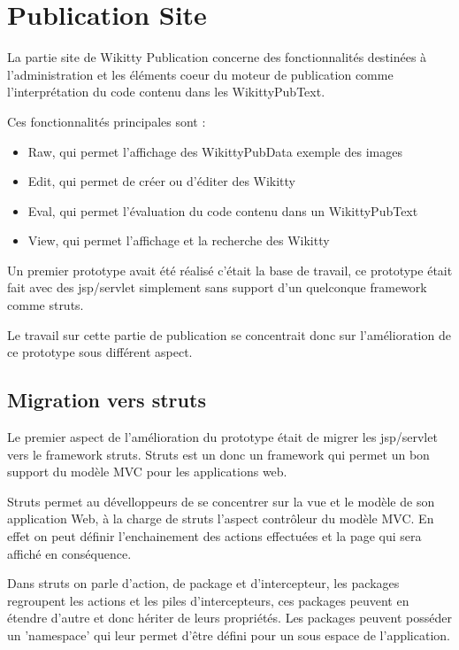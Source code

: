 \section{Publication Site}

La partie site de Wikitty Publication concerne des fonctionnalités
destinées à l'administration et les éléments coeur du moteur de publication
comme l'interprétation du code contenu dans les WikittyPubText. 

Ces fonctionnalités principales sont :
\begin{itemize}
\item Raw, qui permet l'affichage des WikittyPubData exemple des images
\item Edit, qui permet de créer ou d'éditer des Wikitty
\item Eval, qui permet l'évaluation du code contenu dans un WikittyPubText
\item View, qui permet l'affichage et la recherche des Wikitty
\end{itemize}

Un premier prototype avait été réalisé c'était la base de travail, ce prototype
était fait avec des jsp/servlet simplement sans support d'un quelconque
framework comme struts.

Le travail sur cette partie de publication se concentrait donc sur
l'amélioration de ce prototype sous différent aspect.


\subsection{Migration vers struts}

Le premier aspect de l'amélioration du prototype était de migrer les jsp/servlet
vers le framework struts. Struts est un donc un framework qui permet un bon
support du modèle MVC pour les applications web.

Struts permet au dévelloppeurs de se concentrer sur la vue et le modèle de son
application Web, à la charge de struts l'aspect contrôleur du modèle MVC. En
effet on peut définir l'enchainement des actions effectuées et la page qui sera
affiché en conséquence.

Dans struts on parle d'action, de package et d'intercepteur, les packages
regroupent les actions et les piles d'intercepteurs, ces packages peuvent en
étendre d'autre et donc hériter de leurs propriétés. Les packages peuvent
posséder un 'namespace' qui leur permet d'être défini pour un sous espace de
l'application.

